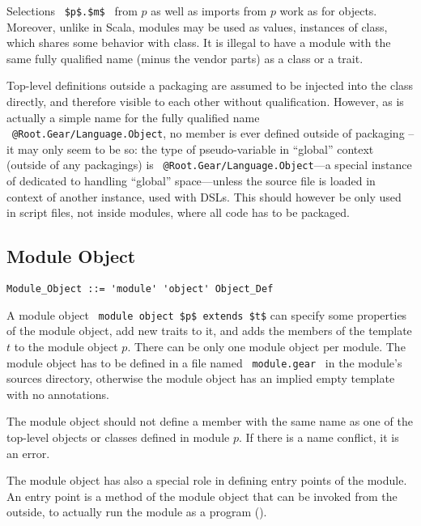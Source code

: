 Selections ~\lstinline!$p$.$m$!~ from $p$ as well as imports from $p$ work as for objects. Moreover, unlike in Scala, modules may be used as values, instances of  class, which shares some behavior with  class. It is illegal to have a module with the same fully qualified name (minus the vendor parts) as a class or a trait. 

Top-level definitions outside a packaging are assumed to be injected into the  class directly, and therefore visible to each other without qualification. However, as  is actually a simple name for the fully qualified name ~\lstinline!@Root.Gear/Language.Object!, no member is ever defined outside of packaging -- it may only seem to be so: the type of  pseudo-variable in ``global'' context (outside of any packagings) is ~\lstinline!@Root.Gear/Language.Object!---a special instance of  dedicated to handling ``global'' space---unless the source file is loaded in context of another instance, used with DSLs. This should however be only used in script files, not inside modules, where all code has to be packaged. 






\subsection{Module Object}

\syntax\begin{lstlisting}
Module_Object ::= 'module' 'object' Object_Def
\end{lstlisting}

A module object ~\lstinline!module object $p$ extends $t$! can specify some properties of the module object, add new traits to it, and adds the members of the template $t$ to the module object $p$. There can be only one module object per module. The module object has to be defined in a file named ~\lstinline[deletekeywords={module}]!module.gear!~ in the module's sources directory, otherwise the module object has an implied empty template with no annotations. 

The module object should not define a member with the same name as one of the top-level objects or classes defined in module $p$. If there is a name conflict, it is an error. 

The module object has also a special role in defining entry points of the module. An entry point is a method of the module object that can be invoked from the outside, to actually run the module as a program (). 

